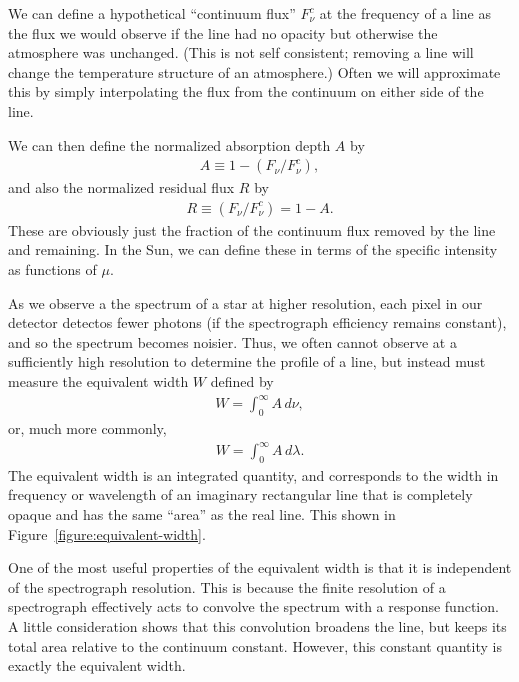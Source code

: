 We can define a hypothetical ``continuum flux'' $F_\nu^c$
at the frequency of a line as the flux we would observe if
the line had no opacity but otherwise the atmosphere was
unchanged. (This is not self consistent; removing a line
will change the temperature structure of an atmosphere.)
Often we will approximate this by simply interpolating the
flux from the continuum on either side of the line.

We can then define the normalized absorption depth $A$ by
\begin{align}
A \equiv 1 - (F_\nu / F_\nu^c),
\end{align}
and also the normalized residual flux $R$ by
\begin{align}
R \equiv (F_\nu / F_\nu^c) = 1 - A.
\end{align}
These are obviously just the fraction of the continuum flux
removed by the line and remaining. In the Sun, we can define
these in terms of the specific intensity as functions of
$\mu$.

As we observe a the spectrum of a star at higher resolution,
each pixel in our detector detectos fewer photons (if the
spectrograph efficiency remains constant), and so the
spectrum becomes noisier. Thus, we often cannot observe at a
sufficiently high resolution to determine the profile of a
line, but instead must measure the equivalent width $W$
defined by
\begin{align}
W = \int_0^\infty A\,d\nu,
\end{align}
or, much more commonly,
\begin{align}
W = \int_0^\infty A\,d\lambda.
\end{align}
The equivalent width is an
integrated quantity, and corresponds to the width in frequency or wavelength of an
imaginary rectangular line that is completely opaque and has the same
``area'' as the real line. This shown in Figure~\ref{figure:equivalent-width}.

One of the most useful properties of the equivalent width is
that it is independent of the spectrograph resolution. This
is because the finite resolution of a spectrograph
effectively acts to convolve the spectrum with a response
function. A little consideration shows that this convolution
broadens the line, but keeps its total area relative to the
continuum constant. However, this constant quantity is
exactly the equivalent width.


